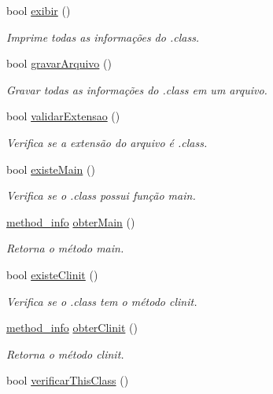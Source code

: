 \begin{DoxyCompactItemize}
bool \hyperlink{classLeitorExibidor_a544bd7574553d9015b22c2507971e7f5}{exibir} ()
\begin{DoxyCompactList}\small\item\em Imprime todas as informações do .class. \end{DoxyCompactList}\item 
bool \hyperlink{classLeitorExibidor_a8dcf6961e13ad6830f62e7839448b235}{gravar\+Arquivo} ()
\begin{DoxyCompactList}\small\item\em Gravar todas as informações do .class em um arquivo. \end{DoxyCompactList}\item 
bool \hyperlink{classLeitorExibidor_a83ed9ca5a7b4442ae3449daffc0d3d5c}{validar\+Extensao} ()
\begin{DoxyCompactList}\small\item\em Verifica se a extensão do arquivo é .class. \end{DoxyCompactList}\item 
bool \hyperlink{classLeitorExibidor_a431c625c01124f40e7b6f6fab2bdb7f2}{existe\+Main} ()
\begin{DoxyCompactList}\small\item\em Verifica se o .class possui função main. \end{DoxyCompactList}\item 
\hyperlink{structmethod__info}{method\+\_\+info} \hyperlink{classLeitorExibidor_a161f1cc97c2c71c800cf588f8a4eab67}{obter\+Main} ()
\begin{DoxyCompactList}\small\item\em Retorna o método main. \end{DoxyCompactList}\item 
bool \hyperlink{classLeitorExibidor_a5a3ef889b1e38506d9d0df17255cad4e}{existe\+Clinit} ()
\begin{DoxyCompactList}\small\item\em Verifica se o .class tem o método clinit. \end{DoxyCompactList}\item 
\hyperlink{structmethod__info}{method\+\_\+info} \hyperlink{classLeitorExibidor_a58636f719aebaaa46524233b94b46537}{obter\+Clinit} ()
\begin{DoxyCompactList}\small\item\em Retorna o método clinit. \end{DoxyCompactList}\item 
bool \hyperlink{classLeitorExibidor_a89d56b461514ed8fea8987ee52fa2eb9}{verificar\+This\+Class} ()

\end{DoxyCompactItemize}
